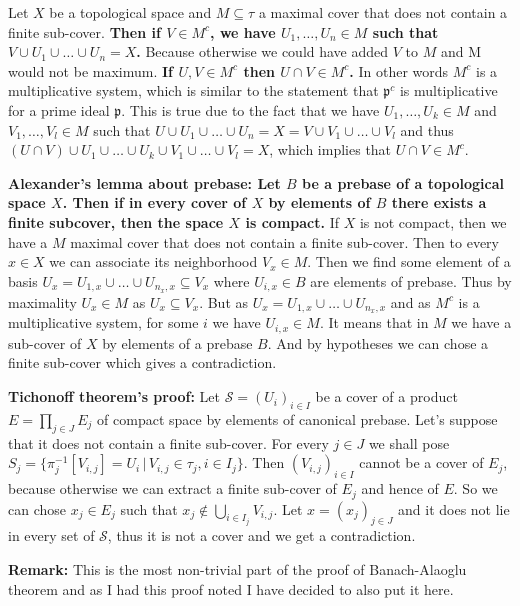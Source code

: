 Let $X$ be a topological space and $M\subseteq\tau$ a maximal cover that does
not contain a finite sub-cover. \textbf{Then if $V\in M^c$, we have $U_1,\ldots,
U_n\in M$ such that $V\cup U_1\cup\ldots\cup U_n=X$.} Because otherwise we
could have added $V$ to $M$ and M would not be maximum. \textbf{If
$U,V\in M^c$ then $U\cap V\in M^c$.} In other words $M^c$ is a multiplicative
system, which is similar to the statement that $\mathfrak{p}^c$ is multiplicative
for a prime ideal $\mathfrak{p}$. This is true due to the fact that we have
$U_1,\ldots,U_k\in M$ and $V_1,\ldots,V_l\in M$ such that $U\cup U_1\cup\ldots
\cup U_n = X = V\cup V_1\cup\ldots\cup V_l$ and thus $(U\cap V)\cup U_1\cup\ldots
\cup U_k\cup V_1\cup\ldots\cup V_l=X$, which implies that $U\cap V\in M^c$.
\vspace{1ex}

\textbf{Alexander's lemma about prebase: Let $B$ be a prebase of a topological
space $X$. Then if in every cover of $X$ by elements of $B$ there exists a finite
subcover, then the space $X$ is compact.} If $X$ is not compact, then we have
a $M$ maximal cover that does not contain a finite sub-cover. Then to every
$x\in X$ we can associate its neighborhood $V_x\in M$. Then we find some
element of a basis $U_x=U_{1,x}\cup\ldots\cup U_{n_x,x}\subseteq V_x$ where
$U_{i,x}\in B$ are elements of prebase. Thus by maximality $U_x\in M$ as
$U_x\subseteq V_x$. But as $U_x=U_{1,x}\cup\ldots\cup U_{n_x,x}$ and as $M^c$
is a multiplicative system, for some $i$ we have $U_{i,x}\in M$. It means that
in $M$ we have a sub-cover of $X$ by elements of a prebase $B$. And by hypotheses
we can chose a finite sub-cover which gives a contradiction.
\vspace{1ex}

\textbf{Tichonoff theorem's proof:} Let $\mathcal{S}=(U_i)_{i\in I}$ be a cover of a
product $E=\prod_{j\in J} E_j$ of compact space by elements of canonical prebase.
Let's suppose that it does not contain a finite sub-cover. For every $j\in J$
we shall pose $S_j=\{\pi_j^{-1}[V_{i,j}]=U_i\,|\,V_{i,j}\in\tau_j,i\in I_j\}$.
Then $(V_{i,j})_{i\in I}$ cannot be a cover of $E_j$, because otherwise we can
extract a finite sub-cover of $E_j$ and hence of $E$. So we can chose $x_j\in
E_j$ such that $x_j\notin\bigcup_{i\in I_j}V_{i,j}$. Let $x=(x_j)_{j\in J}$ and
it does not lie in every set of $\mathcal{S}$, thus it is not a cover and we get
a contradiction.

\vspace{1ex}
\textbf{Remark:} This is the most non-trivial part of the proof of Banach-Alaoglu
theorem and as I had this proof noted I have decided to also put it here.


